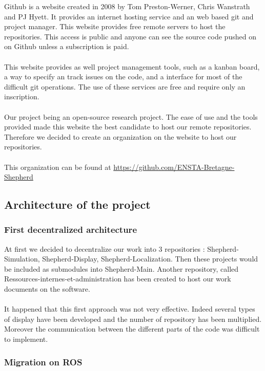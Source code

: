 \documentclass[a4paper]{report}
\begin{document}
Github is a website created in 2008 by Tom Preston-Werner, Chris Wanstrath and PJ Hyett. It provides an internet hosting service and an web based git and project manager. This website provides free remote servers to host the repositories. This access is public and anyone can see the source code pushed on on Github unless a subscription is paid.\\
\\
This website provides as well project management tools, such as a kanban board, a way to specify an track issues on the code, and a interface for most of the difficult git operations. The use of these services are free and require only an inscription.\\
\\
Our project being an open-source research project. The ease of use and the tools provided made this website the best candidate to host our remote repositories. Therefore we decided to create an organization on the website to host our repositories. \\
\\
This organization can be found at \href{https://github.com/ENSTA-Bretagne-Shepherd}{https://github.com/ENSTA-Bretagne-Shepherd}

\subsection{Architecture of the project} 

\subsubsection{First decentralized architecture}

At first we decided to decentralize our work into 3 repositories : Shepherd-Simulation, Shepherd-Display, Shepherd-Localization. Then these projects would be included as submodules into Shepherd-Main. Another repository, called Ressources-internes-et-administration has been created to host our work documents on the software.\\
\\
It happened that this first approach was not very effective. Indeed several types of display have been developed and the number of repository has been multiplied. Moreover the communication between the different parts of the code was difficult to implement.

\subsubsection{Migration on ROS}
\end{document}
